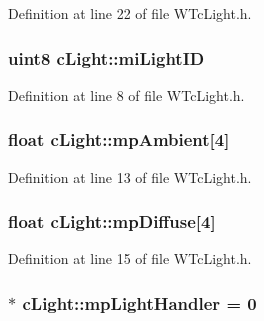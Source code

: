 Definition at line 22 of file WTcLight.h.

\hypertarget{classc_light_a0a636a1b5d3068e44d71ed4f5e58c86c}{
\subsubsection[{miLightID}]{\setlength{\rightskip}{0pt plus 5cm}uint8 {\bf cLight::miLightID}}}
\label{classc_light_a0a636a1b5d3068e44d71ed4f5e58c86c}


Definition at line 8 of file WTcLight.h.

\hypertarget{classc_light_a69a6e96ee70410b23201aa0eacb50326}{
\subsubsection[{mpAmbient}]{\setlength{\rightskip}{0pt plus 5cm}float {\bf cLight::mpAmbient}\mbox{[}4\mbox{]}}}
\label{classc_light_a69a6e96ee70410b23201aa0eacb50326}


Definition at line 13 of file WTcLight.h.

\hypertarget{classc_light_aa9c9538d45ce0ba6bb0c36b257c609e9}{
\subsubsection[{mpDiffuse}]{\setlength{\rightskip}{0pt plus 5cm}float {\bf cLight::mpDiffuse}\mbox{[}4\mbox{]}}}
\label{classc_light_aa9c9538d45ce0ba6bb0c36b257c609e9}


Definition at line 15 of file WTcLight.h.

\hypertarget{classc_light_adb4d7d2b2d8d5e832bee031e70a87fd6}{
\subsubsection[{mpLightHandler}]{ $\ast$ {\bf cLight::mpLightHandler} = 0}}
\label{classc_light_adb4d7d2b2d8d5e832bee031e70a87fd6}


